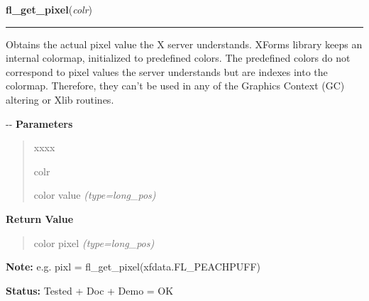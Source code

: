 \hspace{.8\funcindent}\begin{boxedminipage}{\funcwidth}

    \raggedright \textbf{fl\_get\_pixel}(\textit{colr})

    \vspace{-1.5ex}

    \rule{\textwidth}{0.5\fboxrule}
\setlength{\parskip}{2ex}

Obtains the actual pixel value the X server understands. XForms library
keeps an internal colormap, initialized to predefined colors. The
predefined colors do not correspond to pixel values the server understands
but are indexes into the colormap. Therefore, they can't be used in any of
the Graphics Context (GC) altering or Xlib routines.

-{}-
\setlength{\parskip}{1ex}
      \textbf{Parameters}
      \vspace{-1ex}

      \begin{quote}
        \begin{Ventry}{xxxx}

          \item[colr]


color value
            {\it (type=long\_pos)}

        \end{Ventry}

      \end{quote}

      \textbf{Return Value}
    \vspace{-1ex}

      \begin{quote}

color pixel
      {\it (type=long\_pos)}

      \end{quote}

\textbf{Note:} 
e.g. pixl = fl\_get\_pixel(xfdata.FL\_PEACHPUFF)


\textbf{Status:} 
Tested + Doc + Demo = OK


    \end{boxedminipage}

    \label{xformslib:flbasic:fl_get_pixel}

    \vspace{0.5ex}

